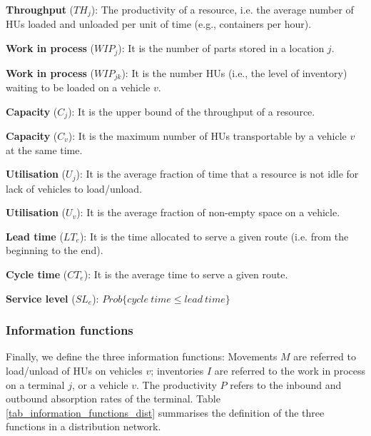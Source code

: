 \textbf{Throughput} ($TH_{j}$): The productivity of a resource, i.e. the average number of HUs loaded and unloaded per unit of time (e.g., containers per hour).\par

\textbf{Work in process} ($WIP_{j}$): It is the number of parts stored in a location $j$.\par

\textbf{Work in process} ($WIP_{jk}$): It is the number HUs (i.e., the level of inventory) waiting to be loaded on a vehicle $v$. \par

\textbf{Capacity} ($C_j$): It is the upper bound of the throughput of a resource.\par

\textbf{Capacity} ($C_v$): It is the maximum number of HUs transportable by a vehicle $v$ at the same time. \par

\textbf{Utilisation} ($U_j$): It is the average fraction of time that a resource is not idle for lack of vehicles to load/unload. \par

\textbf{Utilisation} ($U_v$): It is the average fraction of non-empty space on a vehicle. \par

\textbf{Lead time} ($LT_e$): It is the time allocated to serve a given route (i.e. from the beginning to the end). \par

\textbf{Cycle time} ($CT_e$): It is the average time to serve a given route. \par

\textbf{Service level} ($SL_e$): $Prob\{cycle\ time\le lead\ time\}$

\subsubsection{Information functions}
Finally, we define the three information functions: Movements $M$ are referred to load/unload of HUs on vehicles $v$; inventories $I$ are referred to the work in process on a terminal $j$, or a vehicle $v$. The productivity $P$ refers to the inbound and outbound absorption rates of the terminal. Table \ref{tab_information_functions_dist} summarises the definition of the three functions in a distribution network.



